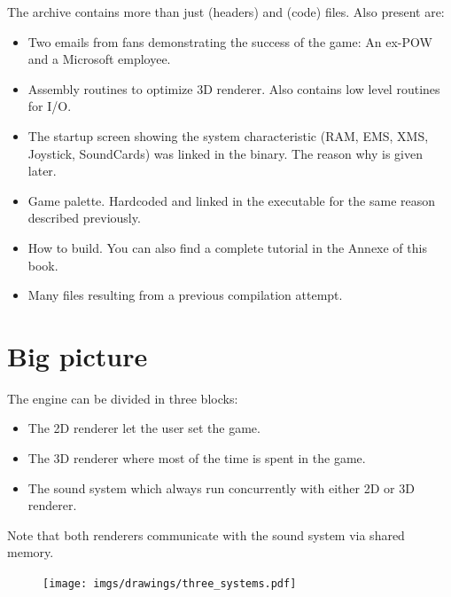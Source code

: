 \documentclass[book.tex]{subfiles}
\begin{document}
The archive contains more than just  (headers) and  (code) files. Also present are:
\begin{itemize}
\item {} Two emails from fans demonstrating the success of the game: An ex-POW and a Microsoft employee.
\item {} Assembly routines to optimize 3D renderer. Also contains low level routines for I/O.
\item {} The startup screen showing the system characteristic (RAM, EMS, XMS, Joystick, SoundCards) was linked in the binary. The reason why is given later.
\item {} Game palette. Hardcoded and linked in the executable for the same reason described previously.
\item {} How to build. You can also find a complete tutorial in the Annexe of this book.
\item Many files resulting from a previous compilation attempt.
\end{itemize}







\section{Big picture}
The engine can be divided in three blocks:
\begin{itemize}
\item The 2D renderer let the user set the game.
\item The 3D renderer where most of the time is spent in the game.
\item The sound system which always run concurrently with either 2D or 3D renderer. 
\end{itemize}
Note that both renderers communicate with the sound system via shared memory.
\par
\begin{figure}[H]
\centering
 \texttt{[image: imgs/drawings/three\_systems.pdf]}
 \end{figure}
 \par

 
\end{document}
